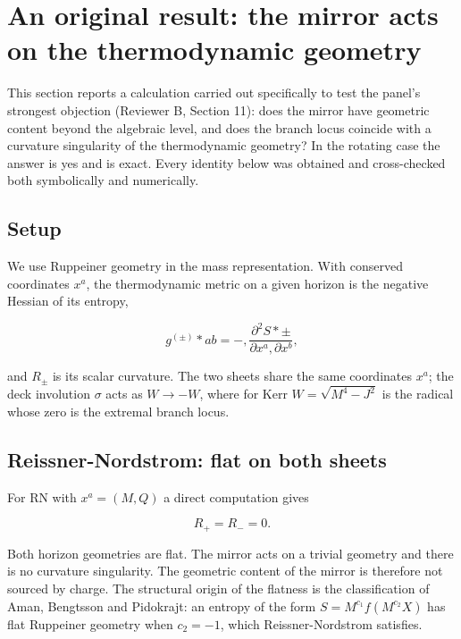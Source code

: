 \documentclass[11pt]{article}
\begin{document}
\section{An original result: the mirror acts on the thermodynamic geometry}

This section reports a calculation carried out specifically to test the panel's strongest objection (Reviewer B, Section 11): does the mirror have geometric content beyond the algebraic level, and does the branch locus coincide with a curvature singularity of the thermodynamic geometry? In the rotating case the answer is yes and is exact. Every identity below was obtained and cross-checked both symbolically and numerically.

\subsection{Setup}

We use Ruppeiner geometry in the mass representation. With conserved coordinates $x^a$, the thermodynamic metric on a given horizon is the negative Hessian of its entropy,

\begin{equation*}
g^{(\pm)}*{ab} = -,\frac{\partial^2 S*\pm}{\partial x^a , \partial x^b},
\tag{7.1}
\end{equation*}

and $R_\pm$ is its scalar curvature. The two sheets share the same coordinates $x^a$; the deck involution $\sigma$ acts as $W \to -W$, where for Kerr $W = \sqrt{M^4 - J^2}$ is the radical whose zero is the extremal branch locus.

\subsection{Reissner-Nordstrom: flat on both sheets}

For RN with $x^a = (M,Q)$ a direct computation gives

\begin{equation*}
R_+ = R_- = 0 .
\tag{7.2}
\end{equation*}

Both horizon geometries are flat. The mirror acts on a trivial geometry and there is no curvature singularity. The geometric content of the mirror is therefore not sourced by charge. The structural origin of the flatness is the classification of Aman, Bengtsson and Pidokrajt: an entropy of the form $S = M^{c_1} f(M^{c_2} X)$ has flat Ruppeiner geometry when $c_2 = -1$, which Reissner-Nordstrom satisfies.
\end{document}
